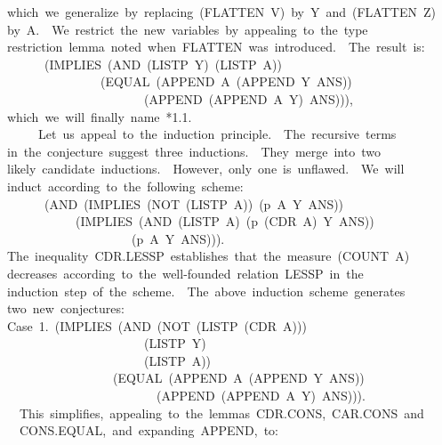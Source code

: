 \documentclass[11pt]{book}
\newenvironment{pubasis}{\begin{flushleft}\ttfamily\small}{\normalsize\rmfamily\end{flushleft}}
\begin{document}
\begin{pubasis}
~~which~we~generalize~by~replacing~(FLATTEN~V)~by~Y~and~(FLATTEN~Z)\\
~~by~A.~~We~restrict~the~new~variables~by~appealing~to~the~type\\
~~restriction~lemma~noted~when~FLATTEN~was~introduced.~~The~result~is:\\

~~~~~~~~(IMPLIES~(AND~(LISTP~Y)~(LISTP~A))\\
~~~~~~~~~~~~~~~~~(EQUAL~(APPEND~A~(APPEND~Y~ANS))\\
~~~~~~~~~~~~~~~~~~~~~~~~(APPEND~(APPEND~A~Y)~ANS))),\\

~~which~we~will~finally~name~*1.1.\\

~~~~~~~Let~us~appeal~to~the~induction~principle.~~The~recursive~terms\\
~~in~the~conjecture~suggest~three~inductions.~~They~merge~into~two\\
~~likely~candidate~inductions.~~However,~only~one~is~unflawed.~~We~will\\
~~induct~according~to~the~following~scheme:\\
~~~~~~~~(AND~(IMPLIES~(NOT~(LISTP~A))~(p~A~Y~ANS))\\
~~~~~~~~~~~~~(IMPLIES~(AND~(LISTP~A)~(p~(CDR~A)~Y~ANS))\\
~~~~~~~~~~~~~~~~~~~~~~(p~A~Y~ANS))).\\
~~The~inequality~CDR.LESSP~establishes~that~the~measure~(COUNT~A)\\
~~decreases~according~to~the~well-founded~relation~LESSP~in~the\\
~~induction~step~of~the~scheme.~~The~above~induction~scheme~generates\\
~~two~new~conjectures:\\

~~Case~1.~(IMPLIES~(AND~(NOT~(LISTP~(CDR~A)))\\
~~~~~~~~~~~~~~~~~~~~~~~~(LISTP~Y)\\
~~~~~~~~~~~~~~~~~~~~~~~~(LISTP~A))\\
~~~~~~~~~~~~~~~~~~~(EQUAL~(APPEND~A~(APPEND~Y~ANS))\\
~~~~~~~~~~~~~~~~~~~~~~~~~~(APPEND~(APPEND~A~Y)~ANS))).\\

~~~~This~simplifies,~appealing~to~the~lemmas~CDR.CONS,~CAR.CONS~and\\
~~~~CONS.EQUAL,~and~expanding~APPEND,~to:\\


\end{pubasis}
\end{document}

